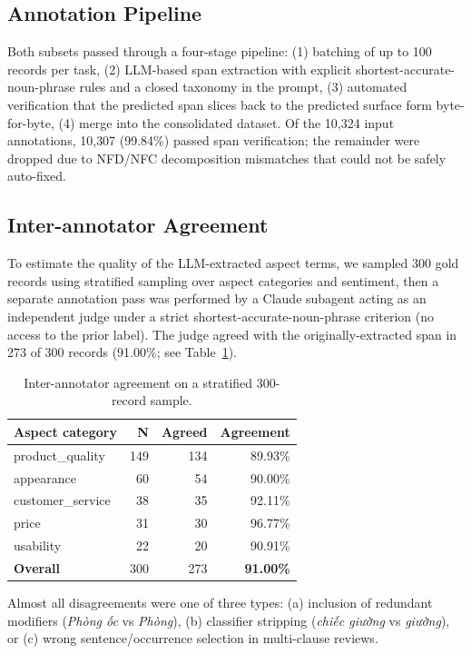 \documentclass[conference]{IEEEtran}
\begin{document}
\subsection{Annotation Pipeline}

Both subsets passed through a four-stage pipeline:
(1) batching of up to 100 records per task,
(2) LLM-based span extraction with explicit shortest-accurate-noun-phrase
    rules and a closed taxonomy in the prompt,
(3) automated verification that the predicted span slices back to the
    predicted surface form byte-for-byte,
(4) merge into the consolidated dataset.
Of the 10{,}324 input annotations, 10{,}307 (99.84\%) passed span
verification; the remainder were dropped due to NFD/NFC decomposition
mismatches that could not be safely auto-fixed.

\subsection{Inter-annotator Agreement}

To estimate the quality of the LLM-extracted aspect terms, we sampled
300 gold records using stratified sampling over aspect categories and
sentiment, then a separate annotation pass was performed by a Claude
subagent acting as an independent judge under a strict
shortest-accurate-noun-phrase criterion (no access to the prior label).
The judge agreed with the originally-extracted span in 273 of 300
records (91.00\%; see Table~\ref{tab:agreement}).

\begin{table}[t]
\caption{Inter-annotator agreement on a stratified 300-record sample.}
\label{tab:agreement}
\centering
\begin{tabular}{lrrr}
\toprule
Aspect category    & N & Agreed & Agreement \\
\midrule
product\_quality   & 149 & 134 & 89.93\% \\
appearance         &  60 &  54 & 90.00\% \\
customer\_service  &  38 &  35 & 92.11\% \\
price              &  31 &  30 & 96.77\% \\
usability          &  22 &  20 & 90.91\% \\
\midrule
\textbf{Overall}   & 300 & 273 & \textbf{91.00\%} \\
\bottomrule
\end{tabular}
\end{table}

Almost all disagreements were one of three types:
(a) inclusion of redundant modifiers (\textit{Phòng ốc} vs \textit{Phòng}),
(b) classifier stripping (\textit{chiếc giường} vs \textit{giường}), or
(c) wrong sentence/occurrence selection in multi-clause reviews.
\end{document}
